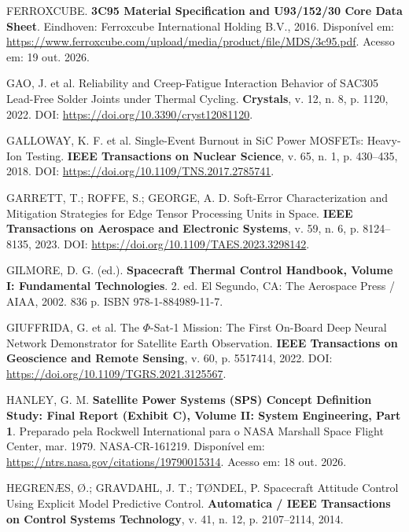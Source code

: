 \vspace{0.2cm}
\noindent FERROXCUBE. \textbf{3C95 Material Specification and U93/152/30 Core Data Sheet}. Eindhoven: Ferroxcube International Holding B.V., 2016. Disponível em: \url{https://www.ferroxcube.com/upload/media/product/file/MDS/3c95.pdf}. Acesso em: 19 out. 2026.

\vspace{0.2cm}
\noindent GAO, J. et al. Reliability and Creep-Fatigue Interaction Behavior of SAC305 Lead-Free Solder Joints under Thermal Cycling. \textbf{Crystals}, v. 12, n. 8, p. 1120, 2022. DOI: \url{https://doi.org/10.3390/cryst12081120}.

\vspace{0.2cm}
\noindent GALLOWAY, K. F. et al. Single-Event Burnout in SiC Power MOSFETs: Heavy-Ion Testing. \textbf{IEEE Transactions on Nuclear Science}, v. 65, n. 1, p. 430--435, 2018. DOI: \url{https://doi.org/10.1109/TNS.2017.2785741}.

\vspace{0.2cm}
\noindent GARRETT, T.; ROFFE, S.; GEORGE, A. D. Soft-Error Characterization and Mitigation Strategies for Edge Tensor Processing Units in Space. \textbf{IEEE Transactions on Aerospace and Electronic Systems}, v. 59, n. 6, p. 8124--8135, 2023. DOI: \url{https://doi.org/10.1109/TAES.2023.3298142}.

\vspace{0.2cm}
\noindent GILMORE, D. G. (ed.). \textbf{Spacecraft Thermal Control Handbook, Volume I: Fundamental Technologies}. 2. ed. El Segundo, CA: The Aerospace Press / AIAA, 2002. 836 p. ISBN 978-1-884989-11-7.

\vspace{0.2cm}
\noindent GIUFFRIDA, G. et al. The $\Phi$-Sat-1 Mission: The First On-Board Deep Neural Network Demonstrator for Satellite Earth Observation. \textbf{IEEE Transactions on Geoscience and Remote Sensing}, v. 60, p. 5517414, 2022. DOI: \url{https://doi.org/10.1109/TGRS.2021.3125567}.

\vspace{0.2cm}
\noindent HANLEY, G. M. \textbf{Satellite Power Systems (SPS) Concept Definition Study: Final Report (Exhibit C), Volume II: System Engineering, Part 1}. Preparado pela Rockwell International para o NASA Marshall Space Flight Center, mar. 1979. NASA-CR-161219. Disponível em: \url{https://ntrs.nasa.gov/citations/19790015314}. Acesso em: 18 out. 2026.

\vspace{0.2cm}
\noindent HEGRENÆS, Ø.; GRAVDAHL, J. T.; TØNDEL, P. Spacecraft Attitude Control Using Explicit Model Predictive Control. \textbf{Automatica / IEEE Transactions on Control Systems Technology}, v. 41, n. 12, p. 2107--2114, 2014.

